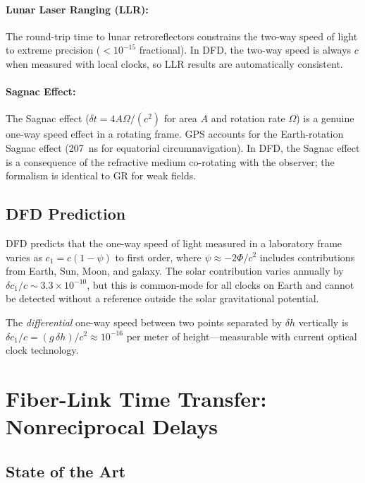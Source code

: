 \documentclass[12pt,letterpaper]{article}
\begin{document}
\paragraph{Lunar Laser Ranging (LLR):}
The round-trip time to lunar retroreflectors constrains the two-way speed
of light to extreme precision ($< 10^{-15}$ fractional). In DFD, the
two-way speed is always $c$ when measured with local clocks, so LLR
results are automatically consistent.

\paragraph{Sagnac Effect:}
The Sagnac effect ($\delta t = 4A\Omega/(c^2)$ for area $A$ and rotation
rate $\Omega$) is a genuine one-way speed effect in a rotating frame.
GPS accounts for the Earth-rotation Sagnac effect (207~ns for equatorial
circumnavigation). In DFD, the Sagnac effect is a consequence of the
refractive medium co-rotating with the observer; the formalism is
identical to GR for weak fields.

\subsection{DFD Prediction}

DFD predicts that the one-way speed of light measured in a laboratory
frame varies as $c_1 = c(1 - \psi)$ to first order, where
$\psi \approx -2\Phi/c^2$ includes contributions from Earth, Sun, Moon,
and galaxy. The solar contribution varies annually by
$\delta c_1/c \sim 3.3\times10^{-10}$, but this is common-mode for
all clocks on Earth and cannot be detected without a reference outside
the solar gravitational potential.

The \emph{differential} one-way speed between two points separated by
$\delta h$ vertically is
$\delta c_1/c = (g\,\delta h)/c^2 \approx 10^{-16}$ per meter of
height---measurable with current optical clock technology.

\section{Fiber-Link Time Transfer: Nonreciprocal Delays}

\subsection{State of the Art}
\end{document}
